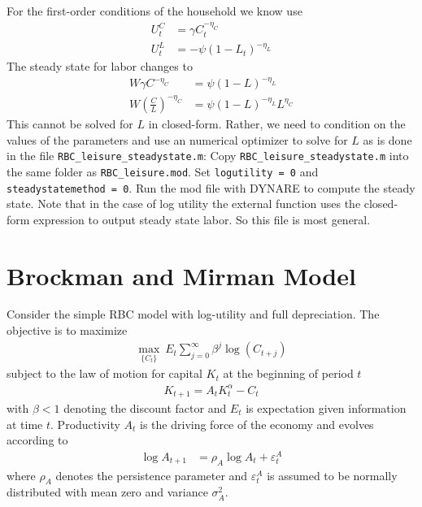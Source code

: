 \documentclass[a4paper]{scrartcl}
\begin{document}
\begin{enumerate}
              \begin{solution}
                  For the first-order conditions of the household we know use
                  \begin{align*}
                      U_t^C & = \gamma C_t^{-\eta_C}     \\
                      U_t^L & = - \psi (1-L_t)^{-\eta_L}
                  \end{align*}
                  The steady state for labor changes to
                  \begin{align*}
                      W \gamma C^{-\eta_C}                  & = \psi(1-L)^{-\eta_L}           \\
                      W  \left(\frac{C}{L}\right)^{-\eta_C} & = \psi(1-L)^{-\eta_L}L^{\eta_C}
                  \end{align*}
                  This cannot be solved for $L$ in closed-form. Rather, we need to condition on the values of the parameters and use an numerical optimizer to solve for $L$ as is done in the file \texttt{RBC\_leisure\_steadystate.m}:
                  Copy \texttt{RBC\_leisure\_steadystate.m} into the same folder as \texttt{RBC\_leisure.mod}. Set \texttt{logutility = 0} and \texttt{steadystatemethod = 0}. Run the mod file with DYNARE to compute the steady state. Note that in the case of log utility the external function uses the closed-form expression to output steady state labor. So this file is most general.
              \end{solution}
    \end{enumerate}
    \newpage
    \section{Brockman and Mirman Model}
    Consider the simple RBC model with log-utility and full depreciation. The objective is to maximize
    \begin{align*}
        \underset{\{C_{t}\}}{\max}~E_t \sum_{j=0}^{\infty} \beta^{j} \log(C_{t+j})
    \end{align*}
    subject to the law of motion for capital $K_t$ at the beginning of period $t$
    \begin{align*}
        K_{t+1} = A_tK_t^\alpha - C_t
    \end{align*}
    with $\beta <1$ denoting the discount factor and $E_t$ is expectation given information at time $t$. Productivity $A_t$ is the driving force of the economy and evolves according to
    \begin{align*}
        \log{A_{t+1}} & = \rho_A \log{A_t}  + \varepsilon_t^A
    \end{align*}
    where $\rho_A$ denotes the persistence parameter and $\varepsilon_t^A$ is assumed to be normally distributed with mean zero and variance $\sigma_A^2$.
    
\end{document}
